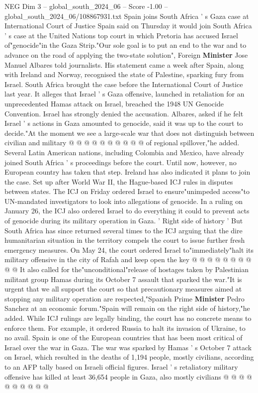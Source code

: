 \begin{textsample}{NEG Dim 3 – global\_south\_2024\_06 – Score -1.00 – global\_south\_2024\_06/108867931.txt}  \label{ex:f3_neg_119}
Spain joins South Africa ' s Gaza case at International Court of Justice Spain said on Thursday it would join South Africa ' s case at the United Nations top court in which Pretoria has accused Israel of"genocide"in the Gaza Strip."Our sole goal is to put an end to the war and to advance on the road of applying the two-state solution", Foreign \textbf{Minister} Jose Manuel Albares told journalists.
His statement came a week after Spain, along with Ireland and Norway, recognised the state of Palestine, sparking fury from Israel.
South Africa brought the case before the International Court of Justice last year.
It alleges that Israel ' s Gaza offensive, launched in retaliation for an unprecedented Hamas attack on Israel, breached the 1948 UN Genocide Convention.
Israel has strongly denied the accusation.
Albares, asked if he felt Israel ' s actions in Gaza amounted to genocide, said it was up to the court to decide."At the moment we see a large-scale war that does not distinguish between civilian and military @ @ @ @ @ @ @ @ @ @ of regional spillover,"he added.
Several Latin American nations, including Colombia and Mexico, have already joined South Africa ' s proceedings before the court.
Until now, however, no European country has taken that step.
Ireland has also indicated it plans to join the case.
Set up after World War II, the Hague-based ICJ rules in disputes between states.
The ICJ on Friday ordered Israel to ensure"unimpeded access"to UN-mandated investigators to look into allegations of genocide.
In a ruling on January 26, the ICJ also ordered Israel to do everything it could to prevent acts of genocide during its military operation in Gaza. ' Right side of history ' But South Africa has since returned several times to the ICJ arguing that the dire humanitarian situation in the territory compels the court to issue further fresh emergency measures.
On May 24, the court ordered Israel to"immediately"halt its military offensive in the city of Rafah and keep open the key @ @ @ @ @ @ @ @ @ @ It also called for the"unconditional"release of hostages taken by Palestinian militant group Hamas during its October 7 assault that sparked the war."It is urgent that we all support the court so that precautionary measures aimed at stopping any military operation are respected,"Spanish Prime \textbf{Minister} Pedro Sanchez at an economic forum."Spain will remain on the right side of history,"he added.
While ICJ rulings are legally binding, the court has no concrete means to enforce them.
For example, it ordered Russia to halt its invasion of Ukraine, to no avail.
Spain is one of the European countries that has been most critical of Israel over the war in Gaza.
The war was sparked by Hamas ' s October 7 attack on Israel, which resulted in the deaths of 1,194 people, mostly civilians, according to an AFP tally based on Israeli official figures.
Israel ' s retaliatory military offensive has killed at least 36,654 people in Gaza, also mostly civilians @ @ @ @ @ @ @ @ @ @

\end{textsample}
